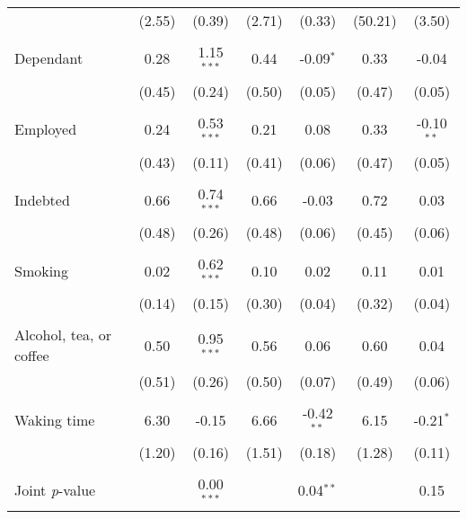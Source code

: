 {\begin{tabular}{l*{6}{c}}
          &   (2.55)&   (0.39)&   (2.71)&   (0.33)&  (50.21)&   (3.50)\\
          &         &         &         &         &         &         \\
Dependant &     0.28&1.15$^{***}$&     0.44&-0.09$^{*}$&     0.33&    -0.04\\
          &   (0.45)&   (0.24)&   (0.50)&   (0.05)&   (0.47)&   (0.05)\\
          &         &         &         &         &         &         \\
Employed  &     0.24&0.53$^{***}$&     0.21&     0.08&     0.33&-0.10$^{**}$\\
          &   (0.43)&   (0.11)&   (0.41)&   (0.06)&   (0.47)&   (0.05)\\
          &         &         &         &         &         &         \\
Indebted  &     0.66&0.74$^{***}$&     0.66&    -0.03&     0.72&     0.03\\
          &   (0.48)&   (0.26)&   (0.48)&   (0.06)&   (0.45)&   (0.06)\\
          &         &         &         &         &         &         \\
Smoking   &     0.02&0.62$^{***}$&     0.10&     0.02&     0.11&     0.01\\
          &   (0.14)&   (0.15)&   (0.30)&   (0.04)&   (0.32)&   (0.04)\\
          &         &         &         &         &         &         \\
Alcohol, tea, or coffee&     0.50&0.95$^{***}$&     0.56&     0.06&     0.60&     0.04\\
          &   (0.51)&   (0.26)&   (0.50)&   (0.07)&   (0.49)&   (0.06)\\
          &         &         &         &         &         &         \\
Waking time&     6.30&    -0.15&     6.66&-0.42$^{**}$&     6.15&-0.21$^{*}$\\
          &   (1.20)&   (0.16)&   (1.51)&   (0.18)&   (1.28)&   (0.11)\\
          &         &         &         &         &         &         \\
\midrule Joint \emph{p}-value&         &0.00$^{***}$&         &0.04$^{**}$&         &     0.15\\
\bottomrule
\end{tabular}
}
